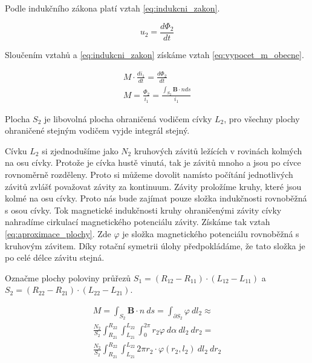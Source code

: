 \documentclass{book}
\newcommand{\vect}[1]{\boldsymbol{#1}}
\begin{document}
Podle indukčního zákona platí vztah \eqref{eq:indukcni_zakon}.

\begin{equation}
\label{eq:indukcni_zakon}
u_2 = \frac{d\Phi_2}{dt}
\end{equation}

Sloučením vztahů \label{eq:definice_m} a \eqref{eq:indukcni_zakon} získáme vztah \eqref{eq:vypocet_m_obecne}.

\begin{equation}
\label{eq:vypocet_m_obecne}
\begin{split}
M \cdot \frac{di_1}{dt} = \frac{d\Phi_2}{dt} \\
M = \frac{\Phi_2}{i_1} = \frac{\int_{S_2} \vect{B} \cdot {n} ds}{i_1}
\end{split}
\end{equation}

Plocha \(S_2\) je libovolná plocha ohraničená vodičem cívky \(L_2\), pro všechny plochy ohraničené stejným vodičem vyjde integrál stejný.

Cívku \(L_2\) si zjednodušíme jako \(N_2\) kruhových závitů ležících v rovinách kolmých na osu cívky. Protože je cívka hustě vinutá, tak je závitů mnoho a jsou po cívce rovnoměrně rozděleny. Proto si můžeme dovolit namísto počítání jednotlivých závitů zvlášť považovat závity za kontinuum. Závity proložíme kruhy, které jsou kolmé na osu cívky. Proto nás bude zajímat pouze složka indukčnosti rovnoběžná s osou cívky. Tok magnetické indukčnosti kruhy ohraničenými závity cívky nahradíme cirkulací magnetického potenciálu závity. Získáme tak vztah \eqref{eq:aproximace_plochy}. Zde \(\varphi\) je složka magnetického potenciálu rovnoběžná s kruhovým závitem. Díky rotační symetrii úlohy předpokládáme, že tato složka je po celé délce závitu stejná.

Označme plochy poloviny průřezů \(S_1 = (R_{12} - R_{11}) \cdot (L_{12} - L_{11})\) a \(S_2 = (R_{22} - R_{21}) \cdot (L_{22} - L_{21})\).

\begin{equation}
\label{eq:aproximace_plochy}
\begin{split}
M = \int_{S_2} \vect{B} \cdot {n} \ ds = \int_{\partial S_2} \varphi \ dl_2 \approx \\
\frac{N_2}{S_2} \int_{R_{21}}^{R_{22}} \int_{L_{21}}^{L_{22}} \int_{0}^{2 \pi} r_2 \varphi \ d\alpha \ dl_2 \ dr_2 = \\
\frac{N_2}{S_2} \int_{R_{21}}^{R_{22}} \int_{L_{21}}^{L_{22}} 2 \pi r_2 \cdot \varphi(r_2, l_2) \ dl_2 \ dr_2 
\end{split}
\end{equation}
\end{document}
